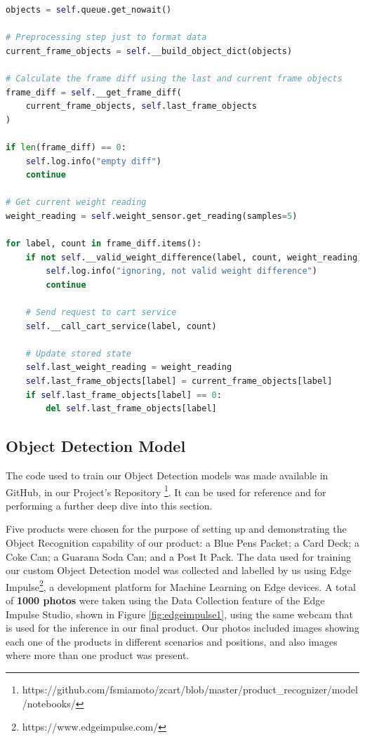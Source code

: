 \documentclass[openright]{normas-utf-tex} %
\begin{document}
\begin{lstlisting}[language=Python,caption={Product Recognizer thread logic}]
objects = self.queue.get_nowait()

# Preprocessing step just to format data
current_frame_objects = self.__build_object_dict(objects)

# Calculate the frame diff using the last and current frame objects
frame_diff = self.__get_frame_diff(
    current_frame_objects, self.last_frame_objects
)

if len(frame_diff) == 0:
    self.log.info("empty diff")
    continue

# Get current weight reading
weight_reading = self.weight_sensor.get_reading(samples=5)

for label, count in frame_diff.items():
    if not self.__valid_weight_difference(label, count, weight_reading):
        self.log.info("ignoring, not valid weight difference")
        continue

    # Send request to cart service
    self.__call_cart_service(label, count)

    # Update stored state
    self.last_weight_reading = weight_reading
    self.last_frame_objects[label] = current_frame_objects[label]
    if self.last_frame_objects[label] == 0:
        del self.last_frame_objects[label]
\end{lstlisting}

\subsection{Object Detection Model}

The code used to train our Object Detection models was made available in GitHub,
in our Project's Repository
\footnote{https://github.com/fsmiamoto/zcart/blob/master/product\_recognizer/model/notebooks/}.
It can be used for reference and for performing a further deep dive into this section.

Five products were chosen for the purpose of setting up and demonstrating the Object Recognition 
capability of our product: a Blue Pens Packet; a Card Deck; a Coke Can; a Guarana Soda Can; 
and a Post It Pack. 
The data used for training our custom Object Detection model was collected and labelled by us
using Edge Impulse\footnote{https://www.edgeimpulse.com/}, a development platform for Machine 
Learning on Edge devices.
A total of \textbf{1000 photos} were taken using the Data Collection feature of
the Edge Impulse Studio, shown in Figure \ref{fig:edgeimpulse1}, using the same
webcam that is used for the inference in our final product. Our photos included
images showing each one of the products in different scenarios and positions,
and also images where more than one product was present.
\end{document}
